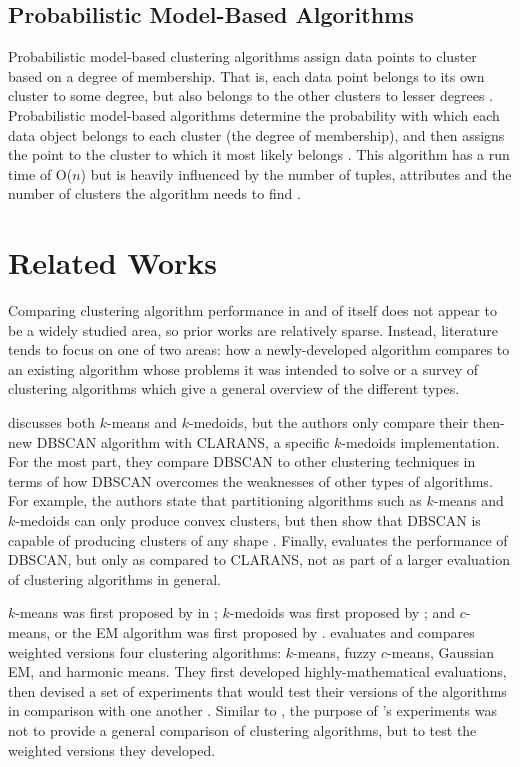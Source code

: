 \documentclass[11pt,letterpaper]{article}
\begin{document}
\subsection{Probabilistic Model-Based Algorithms}
Probabilistic model-based clustering algorithms assign data points to cluster based on a degree of membership.  That is, each data point belongs to its own cluster to some degree, but also belongs to the other clusters to lesser degrees \cite{Han}.  Probabilistic model-based algorithms determine the probability with which each data object belongs to each cluster (the degree of membership), and then assigns the point to the cluster to which it most likely belongs \cite{Han}.  This algorithm has a run time of O($n$) but is heavily influenced by the number of tuples, attributes and the number of clusters the algorithm needs to find \cite{Dempster77}.

\section{Related Works}
Comparing clustering algorithm performance in and of itself does not appear to be a widely studied area, so prior works are relatively sparse.  Instead, literature tends to focus on one of two areas:  how a newly-developed algorithm compares to an existing algorithm whose problems it was intended to solve or a survey of clustering algorithms which give a general overview of the different types.

\cite{Ester96} discusses both $k$-means and $k$-medoids, but the authors only compare their then-new DBSCAN algorithm with CLARANS, a specific $k$-medoids implementation.  For the most part, they compare DBSCAN to other clustering techniques in terms of how DBSCAN overcomes the weaknesses of other types of algorithms.  For example, the authors state that partitioning algorithms such as $k$-means and $k$-medoids can only produce convex clusters, but then show that DBSCAN is capable of producing clusters of any shape \cite{Ester96}.  Finally, \cite{Ester96} evaluates the performance of DBSCAN, but only as compared to CLARANS, not as part of a larger evaluation of clustering algorithms in general.

$k$-means was first proposed by in \cite{Lloyd}; $k$-medoids was first proposed by \cite{Kaufman}; and $c$-means, or the EM algorithm was first proposed by \cite{Dempster77}.  \cite{Nock06} evaluates and compares weighted versions four clustering algorithms:  $k$-means, fuzzy $c$-means, Gaussian EM, and harmonic means.  They first developed highly-mathematical evaluations, then devised a set of experiments that would test their versions of the algorithms in comparison with one another \cite{Nock06}.  Similar to \cite{Ester96}, the purpose of \cite{Nock06}'s experiments was not to provide a general comparison of clustering algorithms, but to test the weighted versions they developed.
\end{document}
